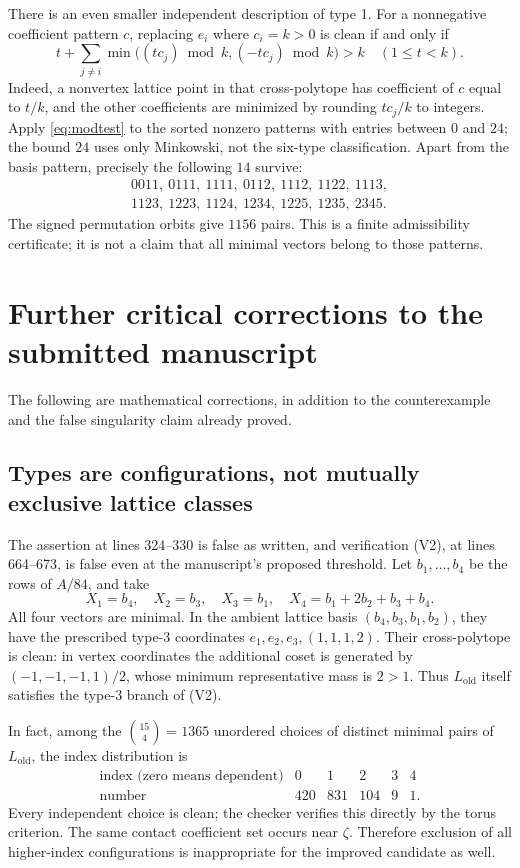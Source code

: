 \documentclass[11pt,reqno]{amsart}
\theoremstyle{definition}
\begin{document}
There is an even smaller independent description of type 1. For a
nonnegative coefficient pattern $c$, replacing $e_i$ where $c_i=k>0$
is clean if and only if
\begin{equation}\label{eq:modtest}
 t+\sum_{j\ne i}\min\bigl((tc_j)\bmod k,(-tc_j)\bmod k\bigr)>k
 \quad(1\le t<k).
\end{equation}
Indeed, a nonvertex lattice point in that cross-polytope has coefficient
of $c$ equal to $t/k$, and the other coefficients are minimized by
rounding $tc_j/k$ to integers. Apply \eqref{eq:modtest} to the sorted
nonzero patterns with entries between $0$ and $24$; the bound $24$ uses
only Minkowski, not the six-type classification. Apart from the basis
pattern, precisely the following $14$ survive:
\[
\begin{gathered}
0011,\ 0111,\ 1111,\ 0112,\ 1112,\ 1122,\ 1113,\\
1123,\ 1223,\ 1124,\ 1234,\ 1225,\ 1235,\ 2345.
\end{gathered}
\]
The signed permutation orbits give $1156$ pairs. This is a finite
admissibility certificate; it is not a claim that all minimal vectors
belong to those patterns.

\section{Further critical corrections to the submitted manuscript}\label{sec:audit}
The following are mathematical corrections, in addition to the
counterexample and the false singularity claim already proved.

\subsection{Types are configurations, not mutually exclusive lattice classes}
The assertion at lines 324--330 is false as written, and verification
(V2), at lines 664--673, is false even at the manuscript's proposed
threshold. Let $b_1,\ldots,b_4$ be the rows of $A/84$, and take
\[
 X_1=b_4,\quad X_2=b_3,\quad X_3=b_1,\quad
 X_4=b_1+2b_2+b_3+b_4.
\]
All four vectors are minimal. In the ambient lattice basis
$(b_4,b_3,b_1,b_2)$, they have the prescribed type-3 coordinates
$e_1,e_2,e_3,(1,1,1,2)$. Their cross-polytope is clean: in vertex
coordinates the additional coset is generated by
$(-1,-1,-1,1)/2$, whose minimum representative mass is $2>1$.
Thus $L_{\mathrm{old}}$ itself satisfies the type-3 branch of (V2).

In fact, among the $\binom{15}{4}=1365$ unordered choices of distinct
minimal pairs of $L_{\mathrm{old}}$, the index distribution is
\[
\begin{array}{c|rrrrr}
\text{index (zero means dependent)}&0&1&2&3&4\\\hline
\text{number}&420&831&104&9&1.
\end{array}
\]
Every independent choice is clean; the checker verifies this directly
by the torus criterion. The same contact coefficient set occurs near
$\zeta$. Therefore exclusion of all higher-index configurations is
inappropriate for the improved candidate as well.
\end{document}
